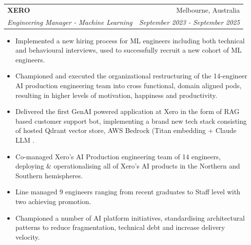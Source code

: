 \documentclass[letterpaper,11pt]{article}
\makeatletter
\newcommand{\resumeItem}[1]{
  \item\small{
    {#1 \vspace{-2pt}}
  }
}
\newcommand{\resumeSubheading}[4]{
  \vspace{-1pt}\item
    \begin{tabular*}{0.97\textwidth}[t]{l@{\extracolsep{\fill}}r}
      \textbf{#1} & #2 \\
      \textit{\small#3} & \textit{\small #4} \\
    \end{tabular*}\vspace{-7pt}
}
\newcommand{\resumeItemListStart}{\begin{itemize}}
\newcommand{\resumeItemListEnd}{\end{itemize}\vspace{0pt}}
\makeatother
\begin{document}
    \resumeSubheading
      {XERO}{Melbourne, Australia}
      {Engineering Manager - Machine Learning}{September 2023 - September 2025}
      \resumeItemListStart
        \resumeItem{Implemented a new hiring process for ML engineers including both technical and behavioural interviews, used to successfully recruit a new cohort of ML engineers.}
        \resumeItem{Championed and executed the organizational restructuring of the 14-engineer AI production engineering team into cross functional, domain aligned pods, resulting in higher levels of motivation, happiness and productivity.}
        \resumeItem{Delivered the first GenAI powered application at Xero in the form of RAG based customer support bot, implementing a brand new tech stack consisting of hosted Qdrant vector store, AWS Bedrock (Titan embedding + Claude LLM}.
        \resumeItem{Co-managed Xero's AI Production engineering team of 14 engineers, deploying \& operationalising all of Xero's AI products in the Northern and Southern hemispheres.}
        \resumeItem{Line managed 9 engineers ranging from recent graduates to Staff level with two achieving promotion.}
        \resumeItem{Championed a number of AI platform initiatives, standardising architectural patterns to reduce fragmentation, technical debt and increase delivery velocity.}
      \resumeItemListEnd
\end{document}
